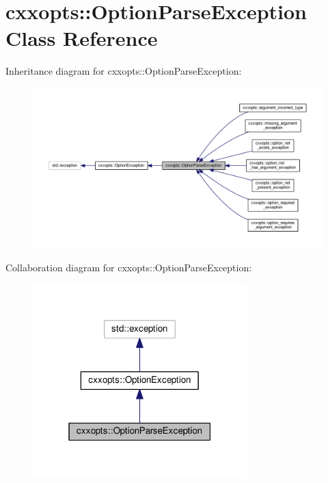 \hypertarget{classcxxopts_1_1OptionParseException}{}\section{cxxopts\+:\+:Option\+Parse\+Exception Class Reference}
\label{classcxxopts_1_1OptionParseException}


Inheritance diagram for cxxopts\+:\+:Option\+Parse\+Exception\+:
\nopagebreak
\begin{figure}[H]
\begin{center}
\leavevmode
\includegraphics[width=350pt]{classcxxopts_1_1OptionParseException__inherit__graph}
\end{center}
\end{figure}


Collaboration diagram for cxxopts\+:\+:Option\+Parse\+Exception\+:
\nopagebreak
\begin{figure}[H]
\begin{center}
\leavevmode
\includegraphics[width=235pt]{classcxxopts_1_1OptionParseException__coll__graph}
\end{center}
\end{figure}
